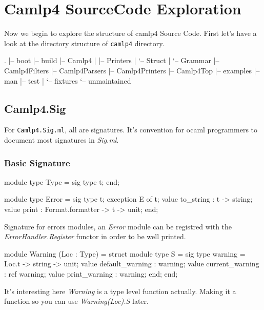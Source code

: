 \section{Camlp4 SourceCode Exploration}
Now we begin to explore the structure of camlp4 Source Code.  First
let's have a look at the directory structure of \verb|camlp4|
directory.


\begin{bashcode}
.
|-- boot
|-- build
|-- Camlp4
|   |-- Printers
|   `-- Struct      
|       `-- Grammar
|-- Camlp4Filters
|-- Camlp4Parsers
|-- Camlp4Printers
|-- Camlp4Top
|-- examples
|-- man
|-- test
|   `-- fixtures
`-- unmaintained   
\end{bashcode}

\subsection{Camlp4.Sig}
For \verb|Camlp4.Sig.ml|, all are signatures. It's convention for
ocaml programmers to document most signatures in \textit{Sig.ml}.

\subsubsection{Basic Signature}

\begin{ocamlcode}
module type Type = sig
  type t;
end;
\end{ocamlcode}

\begin{ocamlcode}
module type Error = sig
  type t;
  exception E of t;
  value to_string : t -> string;
  value print : Format.formatter -> t -> unit;
end;
\end{ocamlcode}

Signature for errors modules, an \textit{Error} module can be
registred with the \textit{ErrorHandler.Register} functor in order to
be well printed.

\begin{ocamlcode}
module Warning (Loc : Type) = struct
  module type S = sig
    type warning = Loc.t -> string -> unit;
    value default_warning : warning;
    value current_warning : ref warning;
    value print_warning   : warning;
  end;
end;
\end{ocamlcode}
It's interesting here \textit{Warning} is a type level function
actually. Making it a function so you can use \textit{Warning(Loc).S}
later.

